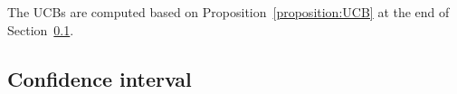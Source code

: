 %
The UCBs are computed based on Proposition~\ref{proposition:UCB} at the end of Section~\ref{sec:confidence-interval}.

\subsection{Confidence interval}
\label{sec:confidence-interval}

